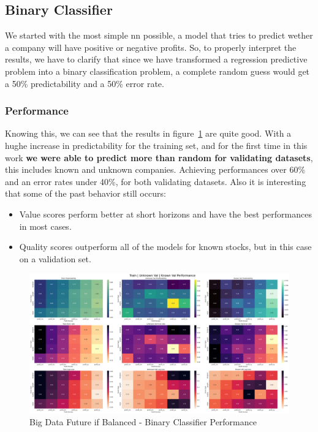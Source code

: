 \documentclass[11pt,english,a4paper,hidelinks]{book}
\begin{document}
\subsection{Binary Classifier}

\noindent We started with the most simple \acrshort{nn} possible, a model that tries to predict wether a company will have positive or negative profits. So, to properly interpret the results, we have to clarify that since we have transformed a regression predictive problem into a binary classification problem, a complete random guess would get a 50\% predictability and a 50\% error rate.

\subsubsection{Performance}
Knowing this, we can see that the results in figure~\ref{fig:binary_classifier} are quite good. With a hughe increase in predictability for the training set, and for the first time in this work \textbf{we were able to predict more than random for validating datasets}, this includes known and unknown companies. Achieving performances over 60\% and an error rates under 40\%, for both validating datasets. Also it is interesting that some of the past behavior still occurs:
\begin{itemize}
    \item Value scores perform better at short horizons and have the best performances in most cases.
    \item Quality scores outperform all of the models for known stocks, but in this case on a validation set.
\end{itemize}

\begin{figure}[H]
    \centering
    \includegraphics[width=1\textwidth]{images/code/models/neural_network/binary_classifier_nn/Big Data future - IF HARD Balanced/performance summary.png}
    \caption{Big Data Future \acrshort{if} Balanced - Binary Classifier Performance}
    \label{fig:binary_classifier}
\end{figure}
\end{document}
